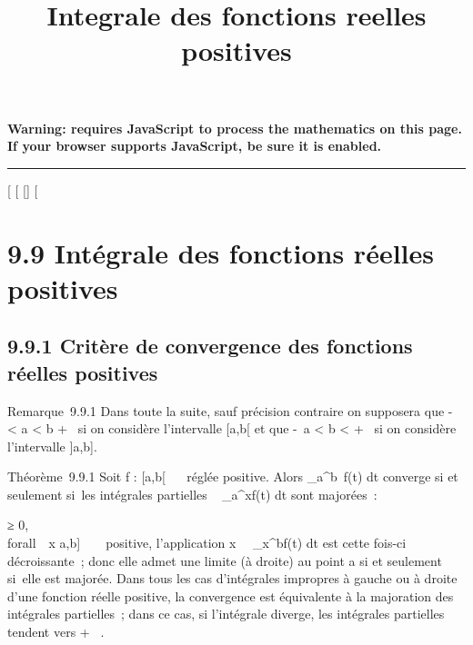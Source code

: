 \documentclass[]{article}
\title{Integrale des fonctions reelles positives}
\author{}
\date{}
\begin{document}
\maketitle

\textbf{Warning: 
requires JavaScript to process the mathematics on this page.\\ If your
browser supports JavaScript, be sure it is enabled.}

\begin{center}\rule{3in}{0.4pt}\end{center}

[
[
[]
[

\section{9.9 Intégrale des fonctions réelles positives}

\subsection{9.9.1 Critère de convergence des fonctions réelles positives}

Remarque~9.9.1 Dans toute la suite, sauf précision contraire on
supposera que -\infty~ < a < b \leq +\infty~ si on considère
l'intervalle [a,b[ et que -\infty~\leq a < b < +\infty~ si on
considère l'intervalle ]a,b].

Théorème~9.9.1 Soit f : [a,b[\rightarrow~ ~ réglée positive. Alors
\int  _a^b~f(t) dt converge si et
seulement si~les intégrales partielles \int ~
_a^xf(t) dt sont majorées~:

\existsM ≥ 0, \\forall~~x \in
[a,b[, \int  _a^x~f(t) dt \leq M

Démonstration Si a \leq x < x' < b, on a
\int  _a^x'~f(t) dt
-\int  _a^x~f(t) dt
=\int  _x^x'~f(t) dt ≥ 0, dont
l'application x\mapsto~\\int
 _a^xf(t) dt est croissante. En conséquence, elle admet
une limite au point b si et seulement si~elle est majorée.

Remarque~9.9.2 Dans le cas d'une fonction réglée f :]a,b] \rightarrow~ ~
positive, l'application
x\mapsto~\int ~
_x^bf(t) dt est cette fois-ci décroissante~; donc elle
admet une limite (à droite) au point a si et seulement si~elle est
majorée. Dans tous les cas d'intégrales impropres à gauche ou à droite
d'une fonction réelle positive, la convergence est équivalente à la
majoration des intégrales partielles~; dans ce cas, si l'intégrale
diverge, les intégrales partielles tendent vers + \infty~.
\end{document}
